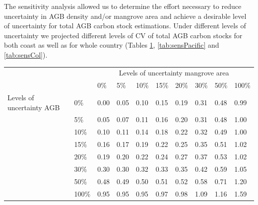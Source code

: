 \documentclass[review, authoryear]{elsarticle}   	%
\begin{document}
The sensitivity analysis allowed us to determine the effort necessary to reduce uncertainty in AGB density and/or mangrove area and achieve a desirable level of uncertainty for total AGB carbon stock estimations. Under different levels of uncertainty we projected different levels of CV of total AGB carbon stocks for both coast as well as for whole country (Tables \ref{tab:sensCaribbean}, \ref{tab:sensPacific} and \ref{tab:sensCol}). 

\begin{table}[htbp]
   \centering
   \begin{tabular}{p{2.0cm}p{1.0cm}p{1.0cm}p{1.0cm}p{1.0cm}p{1.0cm}p{1.0cm}p{1.0cm}p{1.0cm}p{1.0cm}} %
      \toprule
        &&\multicolumn{8}{c}{Levels of uncertainty mangrove area}\\      
      &&0\%&5\%&10\%&15\%&20\%&30\%&50\%&100\%\\
            \midrule 
Levels of uncertainty AGB&0\%&0.00&0.05&0.10&0.15&0.19&0.31&0.48&0.99\\ 
      &5\%&0.05&0.07&0.11&0.16&0.20&0.31&0.48&1.00\\
     &10\%&0.10&0.11&0.14&0.18&0.22&0.32&0.49&1.00\\
      &15\%&0.16&0.17&0.19&0.22&0.25&0.35&0.51&1.02 \\
      &20\%&0.19&0.20&0.22&0.24&0.27&0.37&0.53&1.02\\
     &30\%&0.30&0.30&0.32&0.33&0.35&0.42&0.59&1.05\\
 &50\%&0.48&0.49&0.50&0.51&0.52&0.58&0.71&1.20\\
     &100\%&0.95&0.95&0.95&0.97&0.98&1.09&1.16&1.59\\
               \bottomrule
   \end{tabular}
   \label{tab:sensCaribbean}
\end{table}
\end{document}
